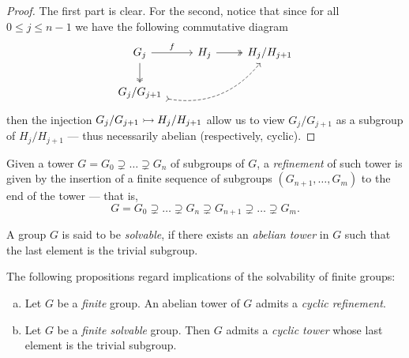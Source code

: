 \begin{proof}
The first part is clear. For the second, notice that since for all \(0 \leq j
\leq n-1\) we have the following commutative diagram
\[
  \begin{tikzcd}
    G_j \ar[d, two heads] \ar[r, "f"] &H_j \ar[r, two heads] & H_j/H_{j+1} \\
    G_j/G_{j+1} \ar[rru, bend right, tail, dashed]
  \end{tikzcd}
\]
then the injection \(G_j/G_{j+1} \rightarrowtail H_j/H_{j+1}\) allow us to view
\(G_j/G_{j+1}\) as a subgroup of \(H_j/H_{j+1}\) --- thus necessarily abelian
(respectively, cyclic).
\end{proof}

\begin{definition}[Refinement]
\label{def:refinement-tower}
Given a tower \(G = G_0 \supsetneq \dots \supsetneq G_n\) of subgroups of \(G\),
a \emph{refinement} of such tower is given by the insertion of a finite
sequence of subgroups \((G_{n+1}, \dots, G_m)\) to the end of the tower --- that
is,
\[
  G = G_{0} \supsetneq \dots \supsetneq G_n \supsetneq G_{n+1} \supsetneq \dots
  \supsetneq G_{m}.
\]
\end{definition}

\begin{definition}
\label{def:solvable-group}
A group \(G\) is said to be \emph{solvable}, if there exists an \emph{abelian
tower} in \(G\) such that the last element is the trivial subgroup.
\end{definition}

\begin{proposition}
\label{prop:finite-grp-cyclic-refinement}
The following propositions regard implications of the solvability of finite
groups:
\begin{enumerate}[(a)]\setlength\itemsep{0em}
\item Let \(G\) be a \emph{finite} group. An abelian tower of \(G\) admits a
  \emph{cyclic refinement}.
\item Let \(G\) be a \emph{finite solvable} group. Then \(G\) admits a
  \emph{cyclic tower} whose last element is the trivial subgroup.
\end{enumerate}
\end{proposition}

